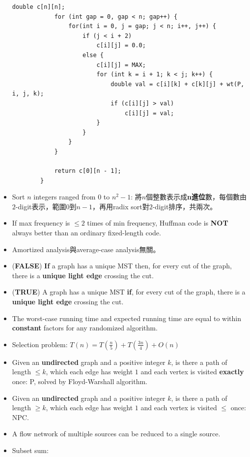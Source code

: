 \begin{itemize}
\begin{lstlisting}[caption={Minimum triangulation.}, captionpos=b]
            double c[n][n];
            for (int gap = 0, gap < n; gap++) {
                for(int i = 0, j = gap; j < n; i++, j++) {
                    if (j < i + 2)
                        c[i][j] = 0.0;
                    else {
                        c[i][j] = MAX;
                        for (int k = i + 1; k < j; k++) {
                            double val = c[i][k] + c[k][j] + wt(P, i, j, k);
                            if (c[i][j] > val)
                                c[i][j] = val;
                        }
                    }
                }
            }

            return c[0][n - 1];
        }
    \end{lstlisting}
    \item Sort $n$ integers ranged from $0$ to $n^2 - 1$: 將$n$個整數表示成\textbf{n進位}數，每個數由$2$-digit表示，範圍$0$到$n - 1$，再用radix sort對$2$-digit排序，共兩次。
    \item If max frequency is $\le 2$ times of min frequency, Huffman code is \textbf{NOT} always better than an ordinary fixed-length code.
    \item Amortized analysis與average-case analysis無關。
    \item (\textbf{FALSE}) \textbf{If} a graph has a unique MST then, for every cut of the graph, there is a \textbf{unique light edge} crossing the cut.
    \item (\textbf{TRUE}) A graph has a unique MST \textbf{if}, for every cut of the graph, there is a \textbf{unique light edge} crossing the cut.
    \item The worst-case running time and expected running time are equal to within \textbf{constant} factors for any randomized algorithm.
    \item Selection problem: $T(n) = T(\frac{n}{5}) + T(\frac{3n}{4}) + O(n)$
    \item Given an \textbf{undirected} graph and a positive integer $k$, is there a path of length $\le k$, which each edge has weight $1$ and each vertex is visited \textbf{exactly} once: P, solved by Floyd-Warshall algorithm.
    \item Given an \textbf{undirected} graph and a positive integer $k$, is there a path of length $\ge k$, which each edge has weight $1$ and each vertex is visited $\le$ once: NPC.
    \item A flow network of multiple sources can be reduced to a single source.
    \item Subset sum: \\

\end{itemize}

